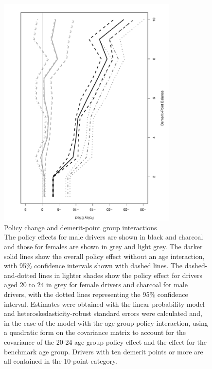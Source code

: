 \begin{figure}
\centering
\includegraphics[width=0.8\textwidth, angle =270]{Figures/points_fig_with_age_int}
\caption{Policy change and demerit-point group interactions \\
The policy effects for male drivers are shown in black and charcoal
and those for females are shown in grey and light grey.
The darker solid lines show the overall policy effect without an age interaction,
with 95\% confidence intervals shown with dashed lines.
The dashed-and-dotted lines in lighter shades show the policy effect 
for drivers aged 20 to 24
in grey for female drivers and charcoal for male drivers,
with the dotted lines representing the 95\% confidence interval.
Estimates were obtained with the linear probability model
and heteroskedasticity-robust standard errors were calculated 
and, in the case of the model with the age group policy interaction,
using a quadratic form on the covariance matrix to account for the covariance of the
20-24 age group policy effect and the effect for the benchmark age group.
Drivers with ten demerit points or more are all contained in the 10-point category.
}\label{fig:points_fig_with_age_int}
\end{figure}
